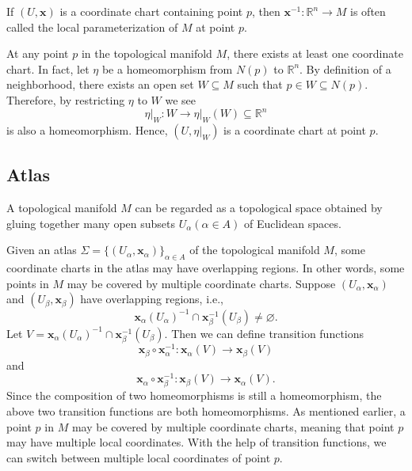 \documentclass{report}
\begin{document}
If $(U,\mathbf{x})$ is a coordinate chart containing point $p$, then $\mathbf{x}^{-1}:\mathbb{R}^n\to M$ is often called the local parameterization of $M$ at point $p$. 

At any point $p$ in the topological manifold $M$, there exists at least one coordinate chart. In fact, let $\eta$ be a homeomorphism from $N(p)$ to $\mathbb{R}^n$. By definition of a neighborhood, there exists an open set $W\subseteq M$ such that $p\in W\subseteq N(p)$. Therefore, by restricting $\eta$ to $W$ we see
$$
\left.\eta\right|_{W}:W\longrightarrow \left.\eta\right|_{W}(W)\subseteq \mathbb{R}^n
$$
is also a homeomorphism. Hence, $(U,\left.\eta\right|_{W})$ is a coordinate chart at point $p$.

\subsection{Atlas}
A topological manifold $M$ can be regarded as a topological space obtained by gluing together many open subsets $U_\alpha(\alpha\in A)$ of Euclidean spaces.

Given an atlas $\Sigma=\{(U_\alpha,\mathbf{x}_\alpha)\}_{\alpha\in
    A}$ of the topological manifold $M$, some coordinate charts in the atlas may have overlapping regions. In other words, some points in $M$ may be covered by multiple coordinate charts. Suppose $(U_\alpha,\mathbf{x}_\alpha)$ and $(U_\beta,\mathbf{x}_\beta)$ have overlapping regions, i.e.,
\[
    \mathbf{x}_\alpha(U_\alpha)^{-1}\cap \mathbf{x}^{-1}_\beta(U_\beta)\ne\varnothing.
\]
Let $V=\mathbf{x}_\alpha(U_\alpha)^{-1}\cap \mathbf{x}^{-1}_\beta(U_\beta)$. Then we can define transition functions
\[
    \mathbf{x}_\beta\circ \mathbf{x}_{\alpha}^{-1}:
    \mathbf{x}_\alpha(V) \longrightarrow
    \mathbf{x}_\beta(V)
\]
and
\[
    \mathbf{x}_{\alpha}\circ
    \mathbf{x}_\beta^{-1}:  \mathbf{x}_\beta(V) \longrightarrow
    \mathbf{x}_\alpha(V).
\]
Since the composition of two homeomorphisms is still a homeomorphism, the above two transition functions are both homeomorphisms. As mentioned earlier, a point $p$ in $M$ may be covered by multiple coordinate charts, meaning that point $p$ may have multiple local coordinates. With the help of transition functions, we can switch between multiple local coordinates of point $p$.
\end{document}
